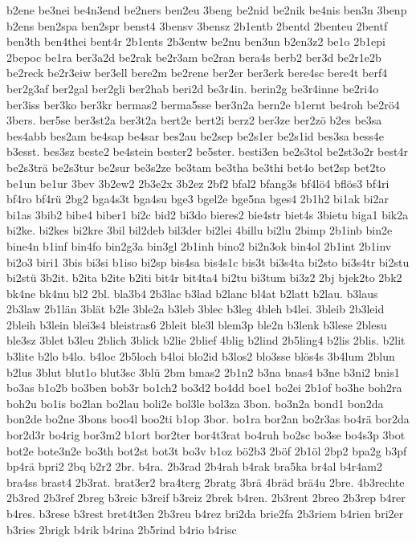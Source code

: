 {b2ene
be3nei
be4n3end
be2ners
ben2eu
3beng
be2nid
be2nik
be4nis
ben3n
3benp
b2ens
ben2spa
ben2spr
benst4
3bensv
3bensz
2b1entb
2bentd
2benteu
2bentf
ben3th
ben4thei
bent4r
2b1ents
2b3entw
be2nu
ben3un
b2en3z2
be1o
2b1epi
2bepoc
be1ra
ber3a2d
be2rak
be2r3am
be2ran
bera4s
berb2
ber3d
be2r1e2b
be2reck
be2r3eiw
ber3ell
bere2m
be2rene
ber2er
ber3erk
bere4sc
bere4t
berf4
ber2g3af
ber2gal
ber2gli
ber2hab
beri2d
be3r4in.
berin2g
be3r4inne
be2ri4o
ber3iss
ber3ko
ber3kr
bermas2
berma5sse
ber3n2a
bern2e
b1ernt
be4roh
be2rö4
3bers.
ber5se
ber3st2a
ber3t2a
bert2e
bert2i
berz2
ber3ze
ber2zö
b2es
be3sa
bes4abb
bes2am
be4sap
be4sar
bes2au
be2sep
be2s1er
be2s1id
bes3sa
bess4e
b3esst.
bes3sz
beste2
be4stein
bester2
be5ster.
besti3en
be2s3tol
be2st3o2r
best4r
be2s3trä
be2s3tur
be2sur
be3s2ze
be3tam
be3tha
be3thi
bet4o
bet2sp
bet2to
be1un
be1ur
3bev
3b2ew2
2b3e2x
3b2ez
2bf2
bfal2
bfang3s
bf4lö4
bflös3
bf4ri
bf4ro
bf4rü
2bg2
bga4s3t
bga4su
bge3
bgel2e
bge5na
bges4
2b1h2
bi1ak
bi2ar
bi1as
3bib2
bibe4
biber1
bi2c
bid2
bi3do
bieres2
bie4str
biet4s
3bietu
biga1
bik2a
bi2ke.
bi2kes
bi2kre
3bil
bil2deb
bil3der
bi2lei
4billu
bi2lu
2bimp
2b1inb
bin2e
bine4n
b1inf
bin4fo
bin2g3a
bin3gl
2b1inh
bino2
bi2n3ok
bin4ol
2b1int
2b1inv
bi2o3
biri1
3bis
bi3si
b1iso
bi2sp
bis4sa
bis4s1c
bis3t
bi3s4ta
bi2sto
bi3s4tr
bi2stu
bi2stü
3b2it.
b2ita
b2ite
b2iti
bit4r
bit4ta4
bi2tu
bi3tum
bi3z2
2bj
bjek2to
2bk2
bk4ne
bk4nu
bl2
2bl.
bla3b4
2b3lac
b3lad
b2lanc
bl4at
b2latt
b2lau.
b3laus
2b3law
2b1län
3blät
b2le
3ble2a
b3leb
3blec
b3leg
4bleh
b4lei.
3bleib
2b3leid
2bleih
b3lein
blei3s4
bleistras6
2bleit
ble3l
blem3p
ble2n
b3lenk
b3lese
2blesu
ble3sz
3blet
b3leu
2blich
3blick
b2lie
2blief
4blig
b2lind
2b5ling4
b2lis
2blis.
b2lit
b3lite
b2lo
b4lo.
b4loc
2b5loch
b4loi
blo2id
b3los2
blo3sse
blös4s
3b4lum
2blun
b2lus
3blut
blut1o
blut3sc
3blü
2bm
bmas2
2b1n2
b3na
bnas4
b3ne
b3ni2
bnis1
bo3as
b1o2b
bo3ben
bob3r
bo1ch2
bo3d2
bo4dd
boe1
bo2ei
2b1of
bo3he
boh2ra
boh2u
bo1is
bo2lan
bo2lau
boli2e
bol3le
bol3za
3bon.
bo3n2a
bond1
bon2da
bon2de
bo2ne
3bons
boo4l
boo2ti
b1op
3bor.
bo1ra
bor2an
bo2r3as
bo4rä
bor2da
bor2d3r
bo4rig
bor3m2
b1ort
bor2ter
bor4t3rat
bo4ruh
bo2sc
bo3se
bo4s3p
3bot
bot2e
bote3n2e
bo3th
bot2st
bot3t
bo3v
b1oz
bö2b3
2böf
2b1öl
2bp2
bpa2g
b3pf
bp4rä
bpri2
2bq
b2r2
2br.
b4ra.
2b3rad
2b4rah
b4rak
bra5ka
br4al
b4r4am2
bra4ss
brast4
2b3rat.
brat3er2
bra4terg
2bratg
3brä
4bräd
brä4u
2bre.
4b3rechte
2b3red
2b3ref
2breg
b3reic
b3reif
b3reiz
2brek
b4ren.
2b3rent
2breo
2b3rep
b4rer
b4res.
b3rese
b3rest
bret4t3en
2b3reu
b4rez
bri2da
brie2fa
2b3riem
b4rien
bri2er
b3ries
2brigk
b4rik
b4rina
2b5rind
b4rio
b4risc
}
